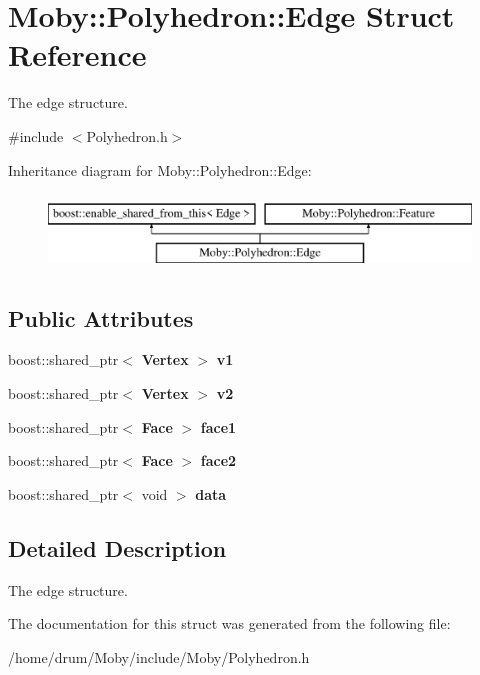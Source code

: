 \section{Moby\-:\-:Polyhedron\-:\-:Edge Struct Reference}
\label{structMoby_1_1Polyhedron_1_1Edge}


The edge structure.  




{\ttfamily \#include $<$Polyhedron.\-h$>$}

Inheritance diagram for Moby\-:\-:Polyhedron\-:\-:Edge\-:\begin{figure}[H]
\begin{center}
\leavevmode
\includegraphics[height=2.000000cm]{structMoby_1_1Polyhedron_1_1Edge}
\end{center}
\end{figure}
\subsection*{Public Attributes}
\begin{DoxyCompactItemize}
\item 
boost\-::shared\-\_\-ptr$<$ {\bf Vertex} $>$ {\bfseries v1}\label{structMoby_1_1Polyhedron_1_1Edge_a51e7bc295faf3f0decef901b7201038b}

\item 
boost\-::shared\-\_\-ptr$<$ {\bf Vertex} $>$ {\bfseries v2}\label{structMoby_1_1Polyhedron_1_1Edge_a118efdc449f8593fcd0a9f4798cdd91f}

\item 
boost\-::shared\-\_\-ptr$<$ {\bf Face} $>$ {\bfseries face1}\label{structMoby_1_1Polyhedron_1_1Edge_a7497c2539606c6b2e26d493ab25ba257}

\item 
boost\-::shared\-\_\-ptr$<$ {\bf Face} $>$ {\bfseries face2}\label{structMoby_1_1Polyhedron_1_1Edge_abf5c19d33d76538d88f7fd2e982ec09d}

\item 
boost\-::shared\-\_\-ptr$<$ void $>$ {\bfseries data}\label{structMoby_1_1Polyhedron_1_1Edge_a068885f4e279d98161db5d7dc5cda343}

\end{DoxyCompactItemize}


\subsection{Detailed Description}
The edge structure. 

The documentation for this struct was generated from the following file\-:\begin{DoxyCompactItemize}
\item 
/home/drum/\-Moby/include/\-Moby/Polyhedron.\-h\end{DoxyCompactItemize}

